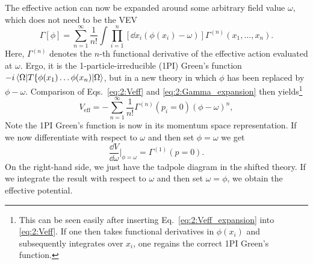 The effective action can now be expanded around some arbitrary field value $\omega$, which does not need to be the \acs{VEV}
\begin{equation}
\Gamma [\phi] = \sum_{n = 1}^\infty \frac{1}{n!} \int \prod_{i = 1}^{n} \left[\dd x_i \left(\phi (x_i) - \omega \right) \right] \Gamma^{(n)}(x_1, \ldots, x_n).
\label{eq:2:Gamma_expansion}
\end{equation}
Here, $\Gamma^{(n)}$ denotes the $n$-th functional derivative of the effective action evaluated at $\omega$. Ergo, it is the 1-particle-irreducible (\acs{1PI}) Green's function $-i\braket{\Omega |T \lbrace \phi(x_1) \dots \phi (x_n)|\Omega}$, but in a new theory in which $\phi$ has been replaced by $\phi - \omega$. Comparison of Eqs.~\eqref{eq:2:Veff} and \eqref{eq:2:Gamma_expansion} then yields\footnote{This can be seen easily after inserting Eq.~\eqref{eq:2:Veff_expansion} into \eqref{eq:2:Veff}. If one then takes functional derivatives in $\phi(x_i)$ and subsequently integrates over $x_i$, one regains the correct \acs{1PI} Green's function.}
\begin{equation}
V_\text{eff} = - \sum_{n = 1}^\infty \frac{1}{n!} \Gamma^{(n)} (p_i = 0) \left( \phi - \omega \right)^n,
\label{eq:2:Veff_expansion}
\end{equation}
Note the \acs{1PI} Green's function is now in its momentum space representation. If we now differentiate with respect to $\omega$ and then set $\phi = \omega$ we get
\begin{equation}
\frac{\dd V}{\dd \omega} \bigg \vert_{\phi = \omega} =  \Gamma^{(1)} (p = 0).
\label{eq:2:Veff_diff}
\end{equation}
On the right-hand side, we just have the tadpole diagram in the shifted theory. If we integrate the result with respect to $\omega$ and then set $\omega = \phi$, we obtain the effective potential.

